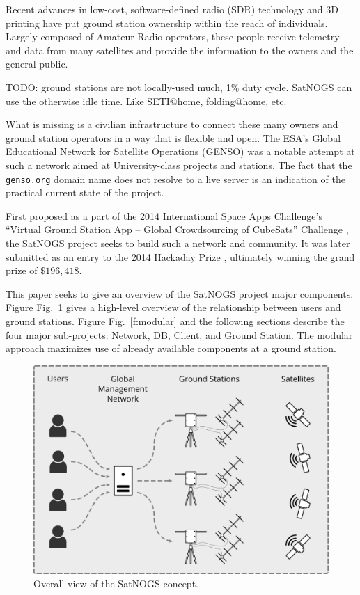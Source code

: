\documentclass[conference,12pt]{IEEEtran}
\newcommand{\figref}[1]{Fig.~\ref{#1}}
\newlength{\figwidth}
\begin{document}
Recent advances in low-cost, software-defined radio (SDR) technology and 3D printing have put ground station ownership within the reach of individuals.
Largely composed of Amateur Radio operators, these people receive telemetry and data from many satellites and provide the information to the owners and the general public.


TODO: ground stations are not locally-used much, 1\% duty cycle.  SatNOGS can use the otherwise idle time.  Like SETI@home, folding@home, etc.

What is missing is a civilian infrastructure to connect these many owners and ground station operators in a way that is flexible and open.
The ESA's Global Educational Network for Satellite Operations (GENSO) \cite{GENSO} was a notable attempt at such a network aimed at University-class projects and stations.
The fact that the \verb|genso.org| domain name does not resolve to a live server is an indication of the practical current state of the project.

First proposed as a part of the 2014 International Space Apps Challenge's ``Virtual Ground Station App -- Global Crowdsourcing of CubeSats'' Challenge \cite{SpaceAppsChallenge2014-SatNOGS}, the SatNOGS project seeks to build such a network and community.
It was later submitted as an entry to the 2014 Hackaday Prize \cite{Hackaday-SatNOGS}, ultimately winning the grand prize of $\$196,418$.

\cite{Hackerspacegr}
\cite{Silver2015}
\cite{SatNOGS-Hamvention2015}

This paper seeks to give an overview of the SatNOGS project major components.
Figure \figref{f:overall} gives a high-level overview of the relationship between users and ground stations.
Figure \figref{f:modular} and the following sections describe the four major sub-projects: Network, DB, Client, and Ground Station.
The modular approach maximizes use of already available components at a ground station.

\begin{figure}[htbp]
\centering
\includegraphics[width=\figwidth]{fig/overall-system}
\caption{Overall view of the SatNOGS concept.}
\label{f:overall}
\end{figure}
\end{document}
